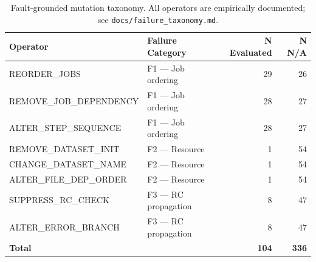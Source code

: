 \begin{table}[t]
\small
\centering
\caption{Fault-grounded mutation taxonomy. All operators are empirically documented; see \texttt{docs/failure\_taxonomy.md}.}
\label{table:mutations}
\begin{tabular}{llrr}
\toprule
Operator & Failure Category & N Evaluated & N N/A \\
\midrule
REORDER\_JOBS & F1 — Job ordering & 29 & 26 \\
REMOVE\_JOB\_DEPENDENCY & F1 — Job ordering & 28 & 27 \\
ALTER\_STEP\_SEQUENCE & F1 — Job ordering & 28 & 27 \\
REMOVE\_DATASET\_INIT & F2 — Resource & 1 & 54 \\
CHANGE\_DATASET\_NAME & F2 — Resource & 1 & 54 \\
ALTER\_FILE\_DEP\_ORDER & F2 — Resource & 1 & 54 \\
SUPPRESS\_RC\_CHECK & F3 — RC propagation & 8 & 47 \\
ALTER\_ERROR\_BRANCH & F3 — RC propagation & 8 & 47 \\
\midrule
\textbf{Total} & & \textbf{104} & \textbf{336} \\
\bottomrule
\end{tabular}
\end{table}
